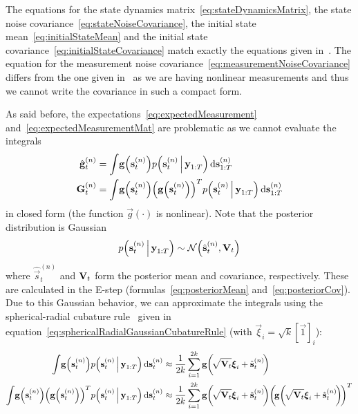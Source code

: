 	The equations for the state dynamics matrix~\eqref{eq:stateDynamicsMatrix}, the state noise covariance~\eqref{eq:stateNoiseCovariance}, the initial state mean~\eqref{eq:initialStateMean} and the initial state covariance~\eqref{eq:initialStateCovariance} match exactly the equations given in~\cite{ghahramaniParameterEstimationLinear1996}. The equation for the measurement noise covariance~\eqref{eq:measurementNoiseCovariance} differs from the one given in~\cite{ghahramaniParameterEstimationLinear1996} as we are having nonlinear measurements and thus we cannot write the covariance in such a compact form.
	
	As said before, the expectations~\eqref{eq:expectedMeasurement} and~\eqref{eq:expectedMeasurementMat} are problematic as we cannot evaluate the integrals
	\begin{align*}
		\hat{\boldsymbol{\mathrm{g}}}_t^{(n)} &= \int\! \boldsymbol{\mathrm{g}}\Big(\boldsymbol{\mathrm{s}}_t^{(n)}\Big) p\Big(\boldsymbol{\mathrm{s}}_t^{(n)} \,\Big\vert\, \boldsymbol{\mathrm{y}}_{1:T}\Big) \dd{\boldsymbol{\mathrm{s}}_{1:T}^{(n)}} \\
		\boldsymbol{\mathrm{G}}_t^{(n)}       &= \int\! \boldsymbol{\mathrm{g}}\Big(\boldsymbol{\mathrm{s}}_t^{(n)}\Big) \Big(\boldsymbol{\mathrm{g}}\Big(\boldsymbol{\mathrm{s}}_t^{(n)}\Big)\Big)^T p\Big(\boldsymbol{\mathrm{s}}_t^{(n)} \,\Big\vert\, \boldsymbol{\mathrm{y}}_{1:T} \Big) \dd{\boldsymbol{\mathrm{s}}_{1:T}^{(n)}}
	\end{align*}
	in closed form (the function \( \vec{g}(\cdot) \) is nonlinear). Note that the posterior distribution is Gaussian
	\begin{equation*}
		p\Big(\boldsymbol{\mathrm{s}}_t^{(n)} \,\Big\vert\, \boldsymbol{\mathrm{y}}_{1:T}\Big) \sim \mathcal{N}\Big(\hat{\boldsymbol{\mathrm{s}}}_{t}^{(n)}, \boldsymbol{\mathrm{V}}_{t}\Big)
	\end{equation*}
	where \( \hat{\vec{s}}_{t}^{(n)} \) and \( \boldsymbol{\mathrm{V}}_{t} \) form the posterior mean and covariance, respectively. These are calculated in the E-step (formulas~\eqref{eq:posteriorMean} and~\eqref{eq:posteriorCov}). Due to this Gaussian behavior, we can approximate the integrals using the spherical-radial cubature rule~\cite{solinCubatureIntegrationMethods2010} given in equation~\eqref{eq:sphericalRadialGaussianCubatureRule} (with \( \vec{\xi}_i = \sqrt{k} [\vec{1}]_i \)):
	\begin{align}
		\int\! \vec{g}\Big(\vec{s}_t^{(n)}\Big) p\Big(\vec{s}_t^{(n)} \Biggiven \vec{y}_{1:T}\Big) \dd{\vec{s}_t^{(n)}}
			&\approx \frac{1}{2k} \sum_{i = 1}^{2k} \vec{g}\bigg(\!\sqrt{\mat{V}_t} \vec{\xi}_i + \hat{\vec{s}}_t^{(n)}\!\bigg)  \label{eq:lgsCubatureG} \\
		\int\! \vec{g}\Big(\vec{s}_t^{(n)}\Big) \Big(\vec{g}\Big(\vec{s}_t^{(n)}\Big)\Big)^T p\Big(\vec{s}_t^{(n)} \Biggiven \vec{y}_{1:T} \Big) \dd{\vec{s}_t^{(n)}}
			&\approx \frac{1}{2k} \sum_{i = 1}^{2k} \vec{g}\bigg(\!\sqrt{\mat{V}_t} \vec{\xi}_i + \hat{\vec{s}}_t^{(n)}\!\bigg) \bigg(\!\vec{g}\bigg(\!\sqrt{\mat{V}_t} \vec{\xi}_i + \hat{\vec{s}}_t^{(n)}\!\bigg)\!\bigg)^T  \label{eq:lgsCubatureGG}
	\end{align}
